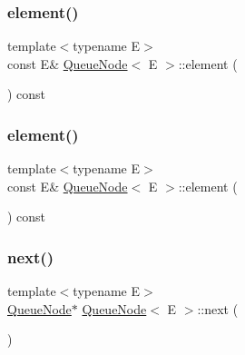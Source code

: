 \mbox{\label{class_queue_node_a1c61b3ed32e089f5901b87022ef84985}} 
\subsubsection{\texorpdfstring{element()}{element()}\hspace{0.1cm}{\footnotesize\ttfamily [2/3]}}
{\footnotesize\ttfamily template$<$typename E$>$ \\
const E\& \mbox{\hyperlink{class_queue_node}{Queue\+Node}}$<$ E $>$\+::element (\begin{DoxyParamCaption}{ }\end{DoxyParamCaption}) const\hspace{0.3cm}{\ttfamily [inline]}}

\mbox{\label{class_queue_node_a1c61b3ed32e089f5901b87022ef84985}} 
\subsubsection{\texorpdfstring{element()}{element()}\hspace{0.1cm}{\footnotesize\ttfamily [3/3]}}
{\footnotesize\ttfamily template$<$typename E$>$ \\
const E\& \mbox{\hyperlink{class_queue_node}{Queue\+Node}}$<$ E $>$\+::element (\begin{DoxyParamCaption}{ }\end{DoxyParamCaption}) const\hspace{0.3cm}{\ttfamily [inline]}}

\mbox{\label{class_queue_node_a8a9fdf488da06533360999ef85db56ea}} 
\subsubsection{\texorpdfstring{next()}{next()}\hspace{0.1cm}{\footnotesize\ttfamily [1/6]}}
{\footnotesize\ttfamily template$<$typename E$>$ \\
\mbox{\hyperlink{class_queue_node}{Queue\+Node}}$\ast$ \mbox{\hyperlink{class_queue_node}{Queue\+Node}}$<$ E $>$\+::next (\begin{DoxyParamCaption}{ }\end{DoxyParamCaption})\hspace{0.3cm}{\ttfamily [inline]}}

